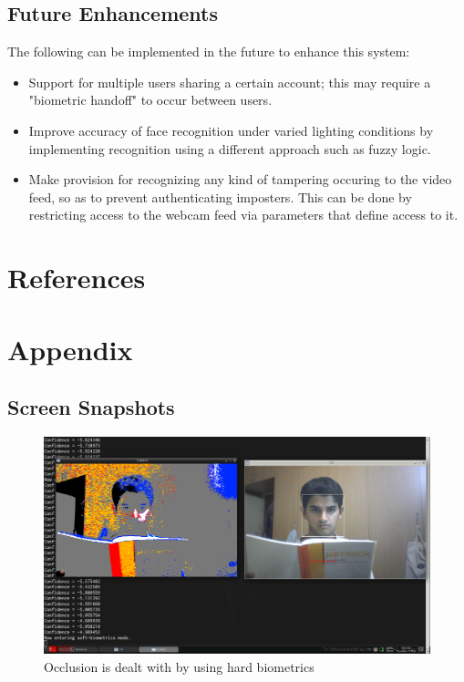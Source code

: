 \documentclass[12pt]{article}			%
\begin{document}
\subsection {Future Enhancements}
The following can be implemented in the future to enhance this system:
\begin{itemize}
\item Support for multiple users sharing a certain account; this may require a "biometric handoff" to occur between users.
\item Improve accuracy of face recognition under varied lighting conditions by implementing recognition using a different approach such as fuzzy logic.
\item Make provision for recognizing any kind of tampering occuring to the video feed, so as to prevent authenticating imposters. This can be done by restricting access to the webcam feed via parameters that define access to it.
\end{itemize}

\newpage
\section{ References }


\newpage
\section{ Appendix }
\subsection{ Screen Snapshots}
\begin{figure}
	\caption{Occlusion is dealt with by using hard biometrics}
	\centering
\includegraphics[scale=0.3]{img/soft4.png}
\end{figure}
\end{document}
